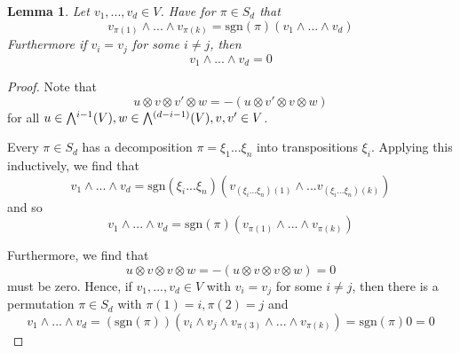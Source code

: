 \documentclass{scrartcl}
\newcommand{\sgn}{\mathrm{sgn}}
\newcommand{\extpow}{\mathchoice{{\textstyle\bigwedge}}
    {{\bigwedge}}
    {{\textstyle\wedge}}
    {{\scriptstyle\wedge}}}
\newtheorem{lemma}[definition]{Lemma}
\begin{document}
\begin{lemma}
    \label{prop:basic_properties_exterior_product}
    Let $v_1, ..., v_d \in V$. Have for $\pi \in S_d$ that
    \begin{equation*}
        v_{\pi(1)} \wedge ... \wedge v_{\pi(k)} = \sgn(\pi) (v_1 \wedge ... \wedge v_d)
    \end{equation*}
    Furthermore if $v_i = v_j$ for some $i \neq j$, then
    \begin{equation*}
        v_1 \wedge ... \wedge v_d = 0
    \end{equation*}
\end{lemma}
\begin{proof}
    Note that
    \begin{equation*}
        u \otimes v \otimes v' \otimes w = -(u \otimes v' \otimes v \otimes w)
    \end{equation*}
    for all $u \in \extpow^{i - 1}(V), w \in \extpow^{(d - i - 1)}(V), v, v' \in V$.

    Every $\pi \in S_d$ has a decomposition $\pi = \xi_1 ... \xi_n$ into transpositions $\xi_i$.
    Applying this inductively, we find that
    \begin{equation*}
        v_1 \wedge ... \wedge v_d = \sgn(\xi_i ... \xi_n) (v_{(\xi_i ... \xi_n)(1)} \wedge ... v_{(\xi_i ... \xi_n)(k)})
    \end{equation*}
    and so
    \begin{equation*}
        v_1 \wedge ... \wedge v_d = \sgn(\pi) (v_{\pi(1)} \wedge ... \wedge v_{\pi(k)})
    \end{equation*}

    Furthermore, we find that
    \begin{equation*}
        u \otimes v \otimes v \otimes w = -(u \otimes v \otimes v \otimes w) = 0
    \end{equation*}
    must be zero.
    Hence, if $v_1, ..., v_d \in V$ with $v_i = v_j$ for some $i \neq j$, then there is a permutation $\pi \in S_d$ with $\pi(1) = i, \pi(2) = j$ and
    \begin{equation*}
        v_1 \wedge ... \wedge v_d = (\sgn(\pi))(v_i \wedge v_j \wedge v_{\pi(3)} \wedge ... \wedge v_{\pi(k)}) = \sgn(\pi) 0 = 0
    \end{equation*}
\end{proof}
\end{document}
